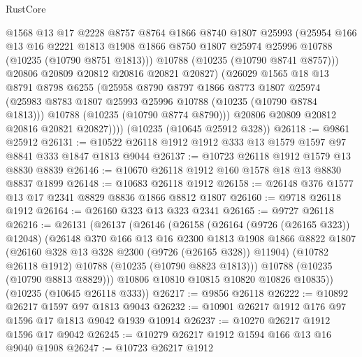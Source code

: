 \begin{lexlean}{RustCore}
\begin{coremodule}
              @1568
              @13
              @17
              @2228
              @8757
              @8764
              @1866
              @8740
              @1807
              @25993
              (@25954
                @166
                @13
                @16
                @2221
                @1813
                @1908
                @1866
                @8750
                @1807
                @25974
                @25996
                @10788
                (@10235 (@10790 @8751 @1813)))
              @10788
              (@10235 (@10790 @8741 @8757)))
            @20806
            @20809
            @20812
            @20816
            @20821
            @20827)
          (@26029
            @1565
            @18
            @13
            @8791
            @8798
            @6255
            (@25958
              @8790
              @8797
              @1866
              @8773
              @1807
              @25974
              (@25983 @8783 @1807 @25993 @25996 @10788 (@10235 (@10790 @8784 @1813)))
              @10788
              (@10235 (@10790 @8774 @8790)))
            @20806
            @20809
            @20812
            @20816
            @20821
            @20827))))
    (@10235 (@10645 @25912 @328))
@26118 := @9861 @25912
@26131 := @10522 @26118 @1912 @1912 @333 @13 @1579 @1597 @97 @8841 @333 @1847 @1813 @9044
@26137 := @10723 @26118 @1912 @1579 @13 @8830 @8839
@26146 := @10670 @26118 @1912 @160 @1578 @18 @13 @8830 @8837 @1899
@26148 := @10683 @26118 @1912
@26158 := @26148 @376 @1577 @13 @17 @2341 @8829 @8836 @1866 @8812 @1807
@26160 := @9718 @26118 @1912
@26164 := @26160 @323 @13 @323 @2341
@26165 := @9727 @26118
@26216 := @26131
    (@26137
      (@26146
        (@26158
          (@26164 (@9726 (@26165 @323)) @12048)
          (@26148
            @370
            @166
            @13
            @16
            @2300
            @1813
            @1908
            @1866
            @8822
            @1807
            (@26160 @328 @13 @328 @2300 (@9726 (@26165 @328)) @11904)
            (@10782 @26118 @1912)
            @10788
            (@10235 (@10790 @8823 @1813)))
          @10788
          (@10235 (@10790 @8813 @8829)))
        @10806
        @10810
        @10815
        @10820
        @10826
        @10835))
    (@10235 (@10645 @26118 @333))
@26217 := @9856 @26118
@26222 := @10892 @26217 @1597 @97 @1813 @9043
@26232 := @10901 @26217 @1912 @176 @97 @1596 @17 @1813 @9042 @1939 @10914
@26237 := @10270 @26217 @1912 @1596 @17 @9042
@26245 := @10279 @26217 @1912 @1594 @166 @13 @16 @9040 @1908
@26247 := @10723 @26217 @1912

\end{coremodule}
\end{lexlean}
